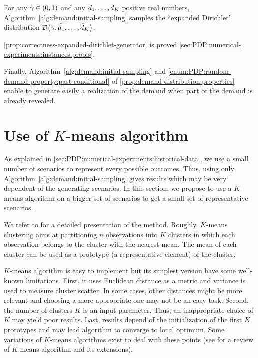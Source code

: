 \begin{prop}\label{prop:correctness-expanded-dirichlet-generator}
For any $\gamma\in\bracket{0,1}$ and any $\tilde{d}_1,\ldots,\tilde{d}_K$ positive real numbers, Algorithm~\ref{alg:demand:initial-sampling} samples the ``expanded Dirichlet'' distribution $\cD\bracket{\gamma,\tilde{\demand}_1,\ldots,\tilde{\demand}_K}$.
\end{prop}


\cref{prop:correctness-expanded-dirichlet-generator} is proved \cref{sec:PDP:numerical-experiments:instances:proofs}.


Finally, Algorithm~\ref{alg:demand:initial-sampling} and \cref{enum:PDP:random-demand-property:past-conditional} of \cref{prop:demand-distribution:properties} enable to generate easily a realization of the demand when part of the demand is already revealed.


\section{Use of $K$-means algorithm}
\label{sec:PDP:numerical-experiments:k-means}


As explained in \cref{sec:PDP:numerical-experiments:historical-data}, we use a small number of scenarios to represent every possible outcomes.
Thus, using only Algorithm~\ref{alg:demand:initial-sampling} gives results which may be very dependent of the generating scenarios.
In this section, we propose to use a $K$-means algorithm on a bigger set of scenarios to get a small set of representative scenarios.


We refer to \citet[Chapter 14]{Hastie2009} for a detailed presentation of the method.
Roughly, $K$-means clustering aims at partitioning $n$ observations into $K$ clusters in which each observation belongs to the cluster with the nearest mean.
The mean of each cluster can be used as a prototype (\ie a representative element) of the cluster.


$K$-means algorithm is easy to implement but its simplest version have some well-known limitations.
First, it uses Euclidean distance as a metric and variance is used to measure cluster scatter.
In some cases, other distances might be more relevant and choosing a more appropriate one may not be an easy task.
Second, the number of clusters $K$ is an input parameter.
Thus, an inappropriate choice of $K$ may yield poor results.
Last, results depend of the initialization of the first $K$ prototypes and may lead algorithm to converge to local optimum.
Some variations of $K$-means algorithms exist to deal with these points (see \citet{Jain2010} for a review of $K$-means algorithm and its extensions).


